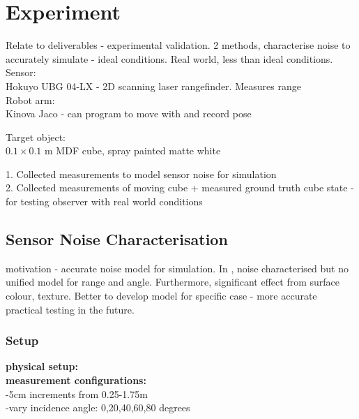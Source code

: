 \chapter{Experiment}
Relate to deliverables - experimental validation.
2 methods, characterise noise to accurately simulate - ideal conditions.
Real world, less than ideal conditions.
Sensor:\\
Hokuyo UBG 04-LX - 2D scanning laser rangefinder. Measures range\\

Robot arm: \\
Kinova Jaco - can program to move with and record pose

Target object: \\
$0.1 \times 0.1$ m MDF cube, spray painted matte white

1. Collected measurements to model sensor noise for simulation\\
2. Collected measurements of moving cube + measured ground truth cube state - for testing observer with real world conditions

\section{Sensor Noise Characterisation} \label{sensor_noise}
motivation - accurate noise model for simulation. In \cite{park2010characterization}, noise characterised but no unified model for range and angle. Furthermore, significant effect from surface colour, texture. Better to develop model for specific case - more accurate practical testing in the future.

	\subsection{Setup}
		\textbf{physical setup:}\\
		\textbf{measurement configurations:}\\
			-5cm increments from 0.25-1.75m\\
			-vary incidence angle: 0,20,40,60,80 degrees
		 
